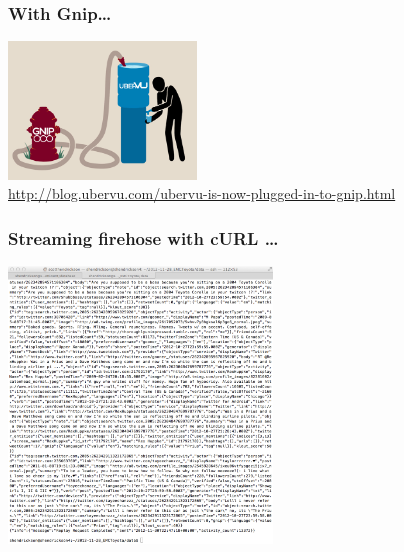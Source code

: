 \documentclass{beamer}
\begin{document}
\begin{frame}\frametitle{With Gnip\ldots}
  \begin{center}
    \includegraphics[width=5cm]{./imgs/GNIP-firehose-office-drinking-fountain_FINAL.jpeg} \\ [6pt]
    \url{http://blog.ubervu.com/ubervu-is-now-plugged-in-to-gnip.html}
  \end{center}
\end{frame}


\begin{frame}\frametitle{Streaming firehose with cURL \ldots}
  \begin{center}
    \includegraphics[width=7cm]{./imgs/hose-json.png} \\
  \end{center}
\end{frame}
\end{document}

